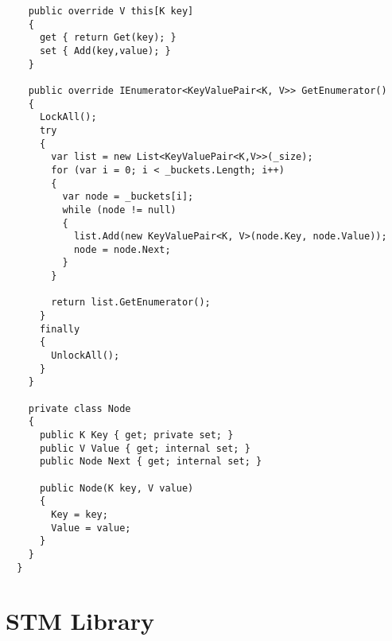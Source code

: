 \begin{lstlisting}
    public override V this[K key]
    {
      get { return Get(key); }
      set { Add(key,value); }
    }

    public override IEnumerator<KeyValuePair<K, V>> GetEnumerator()
    {
      LockAll();
      try
      {
        var list = new List<KeyValuePair<K,V>>(_size);
        for (var i = 0; i < _buckets.Length; i++)
        {
          var node = _buckets[i];
          while (node != null)
          {
            list.Add(new KeyValuePair<K, V>(node.Key, node.Value));
            node = node.Next;
          }
        }

        return list.GetEnumerator();
      }
      finally
      {
        UnlockAll();
      }
    }

    private class Node
    {
      public K Key { get; private set; }
      public V Value { get; internal set; }
      public Node Next { get; internal set; }

      public Node(K key, V value)
      {
        Key = key;
        Value = value;
      }
    }
  }
\end{lstlisting}
\section{STM Library}\label{app:impl_stm_lib}
